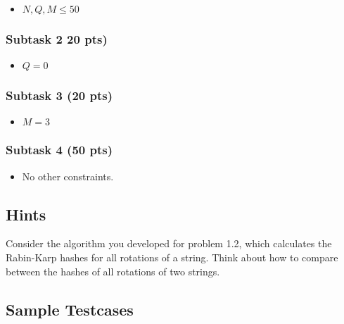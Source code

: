 \begin{itemize}
\tightlist
\item $N, Q, M \le 50$
\end{itemize}

\subsubsection{Subtask 2 20 pts)}\label{subtask-2}

\begin{itemize}
\tightlist
\item $Q = 0$ 
\end{itemize}

\subsubsection{Subtask 3 (20 pts)}\label{subtask-3}

\begin{itemize}
\tightlist
\item $M = 3$
\end{itemize}

\subsubsection{Subtask 4 (50 pts)}\label{subtask-3}

\begin{itemize}
\tightlist
\item No other constraints.
\end{itemize}

\subsection{Hints}

Consider the algorithm you developed for problem 1.2, which calculates the Rabin-Karp hashes for all rotations of a string. Think about how to compare between the hashes of all rotations of two strings.

\newpage

\subsection{Sample Testcases}

